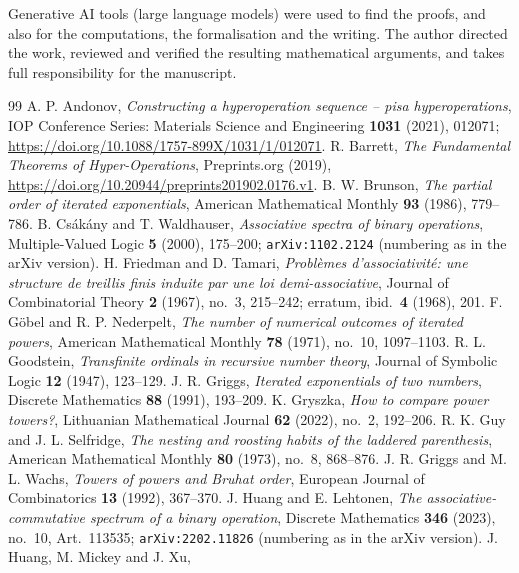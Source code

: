\documentclass[11pt,a4paper]{article}
\theoremstyle{plain}
\theoremstyle{definition}
\begin{document}
Generative AI tools (large language models) were used to find the proofs, and also for
the computations, the formalisation and the writing. The author directed the work,
reviewed and verified the resulting mathematical arguments, and takes full
responsibility for the manuscript.

\begin{thebibliography}{99}
 A. P. Andonov,
  \emph{Constructing a hyperoperation sequence -- pisa hyperoperations},
  IOP Conference Series: Materials Science and Engineering \textbf{1031} (2021),
  012071; \url{https://doi.org/10.1088/1757-899X/1031/1/012071}.
 R. Barrett,
  \emph{The Fundamental Theorems of Hyper-Operations},
  Preprints.org (2019), \url{https://doi.org/10.20944/preprints201902.0176.v1}.
 B. W. Brunson,
  \emph{The partial order of iterated exponentials},
  American Mathematical Monthly \textbf{93} (1986), 779--786.
 B. Cs\'ak\'any and T. Waldhauser,
  \emph{Associative spectra of binary operations},
  Multiple-Valued Logic \textbf{5} (2000), 175--200;
  \texttt{arXiv:1102.2124} (numbering as in the arXiv version).
 H. Friedman and D. Tamari,
  \emph{Probl\`emes d'associativit\'e: une structure de treillis finis induite par une
  loi demi-associative},
  Journal of Combinatorial Theory \textbf{2} (1967), no.~3, 215--242;
  erratum, ibid.\ \textbf{4} (1968), 201.
 F. G\"obel and R. P. Nederpelt,
  \emph{The number of numerical outcomes of iterated powers},
  American Mathematical Monthly \textbf{78} (1971), no.~10, 1097--1103.
 R. L. Goodstein,
  \emph{Transfinite ordinals in recursive number theory},
  Journal of Symbolic Logic \textbf{12} (1947), 123--129.
 J. R. Griggs,
  \emph{Iterated exponentials of two numbers},
  Discrete Mathematics \textbf{88} (1991), 193--209.
 K. Gryszka, \emph{How to compare power towers?},
  Lithuanian Mathematical Journal \textbf{62} (2022), no.~2, 192--206.
 R. K. Guy and J. L. Selfridge,
  \emph{The nesting and roosting habits of the laddered parenthesis},
  American Mathematical Monthly \textbf{80} (1973), no.~8, 868--876.
 J. R. Griggs and M. L. Wachs,
  \emph{Towers of powers and Bruhat order},
  European Journal of Combinatorics \textbf{13} (1992), 367--370.
 J. Huang and E. Lehtonen,
  \emph{The associative-commutative spectrum of a binary operation},
  Discrete Mathematics \textbf{346} (2023), no.~10, Art.~113535;
  \texttt{arXiv:2202.11826} (numbering as in the arXiv version).
 J. Huang, M. Mickey and J. Xu,

\end{thebibliography}
\end{document}
